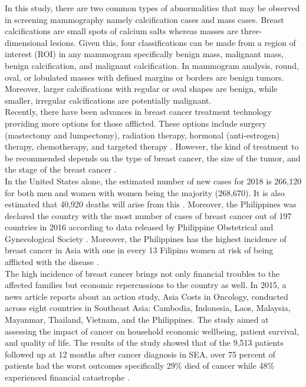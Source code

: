 	In this study, there are two common types of abnormalities that may be observed in screening mammography namely calcification cases and mass cases. Breast calcifications are small spots of calcium salts \cite{calcification} whereas masses are three-dimensional lesions. Given this, four classifications can be made from a region of interest (ROI) in any mammogram specifically benign mass, malignant mass, benign calcification, and malignant calcification. In mammogram analysis, round, oval, or lobulated masses with defined margins or borders are benign tumors. Moreover, larger calcifications with regular or oval shapes are benign, while smaller, irregular calcifications are potentially malignant. \\

	Recently, there have been advances in breast cancer treatment technology providing more options for those afflicted. These options include surgery (mastectomy and lumpectomy), radiation therapy, hormonal (anti-estrogen) therapy, chemotherapy, and targeted therapy \cite{treatmentOptions}. However, the kind of treatment to be recommended depends on the type of breast cancer, the size of the tumor, and the stage of the breast cancer \cite{treatmentHow}. \\
	
	In the United States alone, the estimated number of new cases for 2018 is 266,120 for both men and women with women being the majority (268,670). It is also estimated that 40,920 deaths will arise from this \cite{statistics}. Moreover, the Philippines was declared the country with the most number of cases of breast cancer out of 197 countries in 2016 according to data released by Philippine Obstetrical and Gynecological Society \cite{prevalencePH}. Moreover, the Philippines has the highest incidence of breast cancer in Asia with one in every 13 Filipino women at risk of being afflicted with the disease \cite{incidencePH}. \\

	The high incidence of breast cancer brings not only financial troubles to the affected families but economic repercussions to the country as well. In 2015, a news article reports about an action study, Asia Costs in Oncology, conducted across eight countries in Southeast Asia: Cambodia, Indonesia, Laos, Malaysia, Mayanmar, Thailand, Vietnam, and the Philippines. The study aimed at assessing the impact of cancer on household economic wellbeing, patient survival, and quality of life. The results of the study showed that of the 9,513 patients followed up at 12 months after cancer diagnosis in SEA, over 75 percent of patients had the worst outcomes specifically 29\% died of cancer while 48\% experienced financial catastrophe \cite{cancerBurden}. \\


